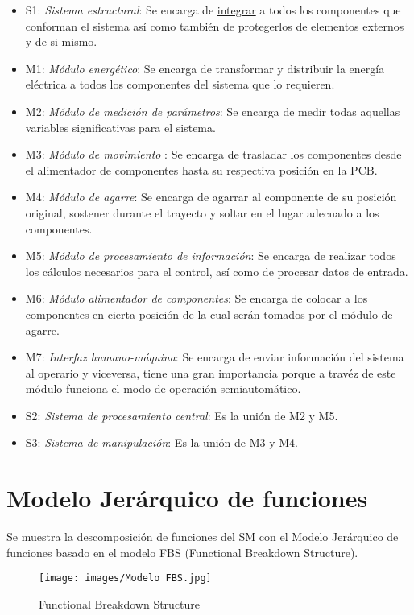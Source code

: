 \begin{itemize}
  \item S1: \textit{Sistema estructural}: Se encarga de \underline{integrar} a todos los componentes que conforman el sistema as\'i como tambi\'en de protegerlos de elementos externos y de si mismo.
  \item M1: \textit{M\'odulo energ\'etico}: Se encarga de transformar y distribuir la energ\'ia el\'ectrica a todos los componentes del sistema que lo requieren.
  \item M2: \textit{M\'odulo de medici\'on de par\'ametros}: Se encarga de medir todas aquellas variables significativas para el sistema.
  \item M3: \textit{M\'odulo de movimiento }: Se encarga de trasladar los componentes desde el alimentador de componentes hasta su respectiva posici\'on en la PCB.
  \item M4: \textit{M\'odulo de agarre}: Se encarga de agarrar al componente de su posici\'on original, sostener durante el trayecto y soltar en el lugar adecuado a los componentes.
  \item M5: \textit{M\'odulo de procesamiento de informaci\'on}: Se encarga de realizar todos los c\'alculos necesarios para el control, as\'i como de procesar datos de entrada.
  \item M6: \textit{M\'odulo alimentador de componentes}: Se encarga de colocar a los componentes en cierta posici\'on de la cual ser\'an tomados por el m\'odulo de agarre.
  \item M7: \textit{Interfaz humano-m\'aquina}: Se encarga de enviar informaci\'on del sistema al operario  y viceversa, tiene una gran importancia porque a trav\'ez de este m\'odulo funciona el modo de operaci\'on semiautom\'atico.
  \item S2: \textit{Sistema de procesamiento central}: Es la uni\'on de M2 y M5.
  \item S3: \textit{Sistema de manipulaci\'on}: Es la uni\'on de M3 y M4.
\end{itemize}



\section{Modelo Jer\'arquico de funciones}
%
Se muestra la descomposici\'on de funciones del SM con el Modelo Jer\'arquico de funciones basado en el modelo FBS (Functional Breakdown Structure).

\begin{figure}[hbtp]
\centering
\texttt{[image: images/Modelo FBS.jpg]}
\caption{Functional Breakdown Structure}
\end{figure}